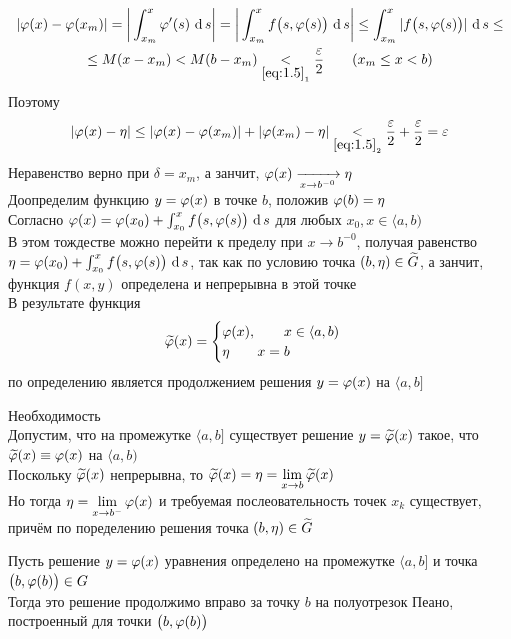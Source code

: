\begin{iproof}
    \begin{multline*}
        |\vphi(x) - \vphi(x_m)| = \bigg| \dint[s]{x_m}x{\vphi'(s)}\bigg| = \bigg| \dint[s]{x_m}x{f \big( s, \vphi(s) \big)}\bigg| \le \dint[s]{x_m}x{|f \big( s, \vphi(s) \big)|} \le \\
        \le M(x - x_m) < M(b - x_m) \underset{\eref{1.5}_1}< \half[\veps] \qquad (x_m \le x < b)
    \end{multline*}
    Поэтому
    $$ |\vphi(x) - \eta| \le |\vphi(x) - \vphi(x_m)| + |\vphi(x_m) - \eta| \underset{\eref{1.5}_2}< \half[\veps] + \half[\veps] = \veps $$
    Неравенство  верно при $ \delta = x_m $, а занчит, $ \vphi(x) \underarr{x \to b^{-0}} \eta $ \\
    Доопределим функцию $ y = \vphi(x) $ в точке $ b $, положив $ \vphi(b) = \eta $ \\
    Согласно  $ \vphi(x) = \vphi(x_0) + \dint[s]{x_0}x{f \big(s, \vphi(s) \big)} $ для любых $ x_0, x \in \langle a, b) $ \\
    В этом тождестве можно перейти к пределу при $ x \to b^{-0} $, получая равенство $ \eta = \vphi(x_0) + \dint[s]{x_0}x{f \big( s, \vphi(s) \big)} $, так как по условию точка $ (b, \eta) \in \vawe{G} $, а занчит, функция $ f(x, y) $ определена и непрерывна в этой точке \\
    В результате функция
    $$ \vawe\vphi(x) =
    \begin{cases}
    	\vphi(x), \qquad x \in \langle a, b) \\
        \eta \qquad x = b
    \end{cases} $$
    по определению является продолжением решения $ y = \vphi(x) $ на $ \langle a, b] $
    \item Необходимость \\
    Допустим, что на промежутке $ \langle a, b] $ существует решение $ y = \vawe\vphi(x) $ такое, что $ \vawe\vphi(x) \equiv \vphi(x) $ на $ \langle a, b) $ \\
    Поскольку $ \vawe\vphi(x) $ непрерывна, то $ \vawe\vphi(x) = \eta = \liml{x \to b}\vawe\vphi(x) $ \\
    Но тогда $ \eta = \liml{x \to b^-}\vphi(x) $ и требуемая послеовательность точек $ x_k $ существует, причём по поределению решения точка $ (b, \eta) \in \vawe{G} $
\end{iproof}

\begin{lemma}
    Пусть решение $ y = \vphi(x) $ уравнения  определено на промежутке $ \langle a, b] $ и точка $ \big( b, \vphi(b) \big) \in G $ \\
    Тогда это решение продолжимо вправо за точку $ b $ на полуотрезок Пеано, построенный для точки $ \big( b, \vphi(b) \big) $
\end{lemma}

